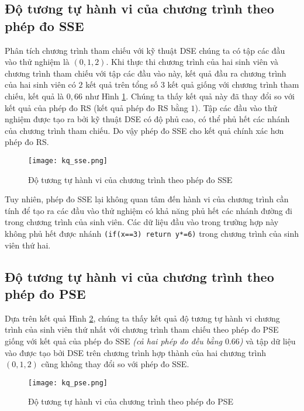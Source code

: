 \subsection{Độ tương tự hành vi của chương trình theo phép đo SSE}

Phân tích chương trình tham chiếu với kỹ thuật DSE chúng ta có tập các đầu vào thử 
nghiệm là $(0, 1, 2)$. Khi thực thi chương trình của hai sinh viên và chương trình 
tham chiếu với tập các đầu vào này, kết quả đầu ra chương trình của hai sinh viên 
có $ 2 $ kết quả trên tổng số 3 kết quả giống với chương trình tham chiếu, kết quả 
là $0,66$ như Hình \ref{fig:results-SSE}. Chúng ta thấy kết quả này đã thay đổi so 
với kết quả của phép đo RS (kết quả phép đo RS bằng $ 1 $). Tập các đầu vào thử 
nghiệm được tạo ra bởi kỹ thuật DSE có độ phủ cao, có thể phủ hết các nhánh của 
chương trình tham chiếu. Do vậy phép đo SSE cho kết quả chính xác hơn phép đo RS.

\begin{figure}[H]
	\begin{center}
		\texttt{[image: kq\_sse.png]}
	\end{center}
	\caption{Độ tương tự hành vi của chương trình theo phép đo SSE}
	\label{fig:results-SSE}
\end{figure}

Tuy nhiên, phép đo SSE lại không quan tâm đến hành vi của chương trình cần tính để 
tạo ra các đầu vào thử nghiệm có khả năng phủ hết các nhánh đường đi trong chương 
trình của sinh viên. Các dữ liệu đầu vào trong trường hợp này không phủ hết được 
nhánh \texttt{(if(x==3) return y*=6)} trong chương trình của sinh viên thứ hai.

\subsection{Độ tương tự hành vi của chương trình theo phép đo PSE}
Dựa trên kết quả Hình \ref{fig:result-PSE}, chúng ta thấy kết quả độ tương tự hành 
vi chương trình của sinh viên thứ nhất với chương trình tham chiếu theo phép đo PSE 
giống với kết quả của phép đo SSE \textit{(cả hai phép đo đều bằng $ 0.66 $)} và tập 
dữ liệu vào được tạo bởi DSE trên chương trình hợp thành của hai chương trình 
$ (0, 1, 2) $ cũng không thay đổi so với phép đo SSE.

\begin{figure}[H]	
	\begin{center}
		\texttt{[image: kq\_pse.png]}
	\end{center}
	\caption{Độ tương tự hành vi của chương trình theo phép đo PSE}	
	\label{fig:result-PSE}	
\end{figure}

